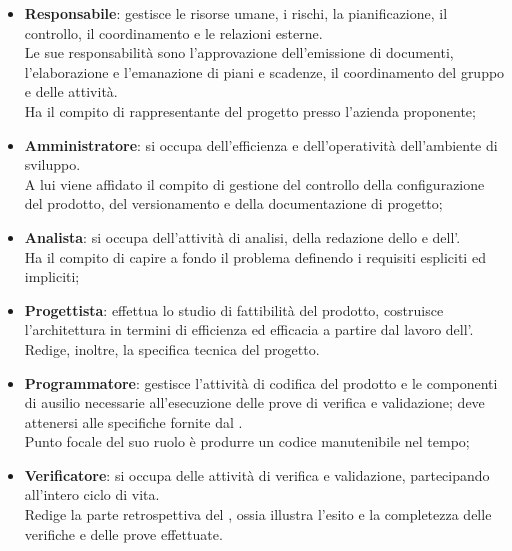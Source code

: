 \begin{itemize}
    \item \textbf{Responsabile}: gestisce le risorse umane, i rischi, la pianificazione, il controllo, il coordinamento e le relazioni esterne.\\ 
            Le sue responsabilità sono l'approvazione dell'emissione di documenti, l'elaborazione e l'emanazione di piani e scadenze, il coordinamento del gruppo e delle attività.\\ 
            Ha il compito di rappresentante del progetto presso l'azienda proponente;
    \item \textbf{Amministratore}: si occupa dell'efficienza e dell'operatività dell'ambiente di sviluppo.\\
            A lui viene affidato il compito di gestione del controllo della configurazione del prodotto, del versionamento e della documentazione di progetto;
    \item \textbf{Analista}: si occupa dell'attività di analisi, della redazione dello \docNameSdF{} e dell'\docNameAdR{}.\\ 
            Ha il compito di capire a fondo il problema definendo i requisiti espliciti ed impliciti;
    \item \textbf{Progettista}: effettua lo studio di fattibilità del prodotto, costruisce l'architettura in termini di efficienza ed efficacia a partire dal lavoro dell'\roleAnalyst. Redige, inoltre, la specifica tecnica del progetto.
    \item \textbf{Programmatore}: gestisce l'attività di codifica del prodotto e le componenti di ausilio necessarie all'esecuzione delle prove di verifica e validazione; deve attenersi alle specifiche fornite dal \roleProjectManager{}.\\ 
            Punto focale del suo ruolo è produrre un codice manutenibile nel tempo;
    \item \textbf{Verificatore}: si occupa delle attività di verifica e validazione, partecipando all'intero ciclo di vita. \\
            Redige la parte retrospettiva del \docNamePdQ{}, ossia illustra l'esito e la completezza delle verifiche e delle prove effettuate.
\end{itemize}

